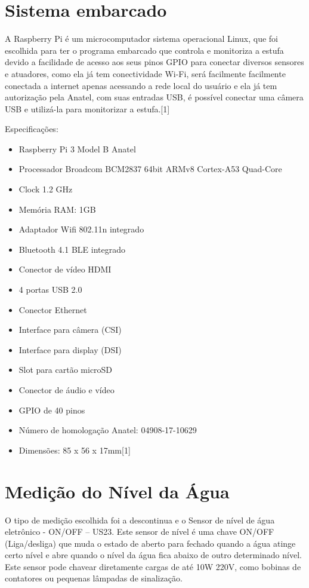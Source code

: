 \section{Sistema embarcado}
A Raspberry Pi é um microcomputador sistema operacional Linux, que foi escolhida para ter o programa embarcado que controla e monitoriza a estufa devido a facilidade de acesso aos seus pinos GPIO para conectar diversos sensores e atuadores, como ela já tem conectividade Wi-Fi, será facilmente facilmente conectada a internet apenas acessando a rede local do usuário e ela já tem autorização pela Anatel, com suas entradas USB, é possível conectar uma câmera USB e utilizá-la para monitorizar a estufa\cite{raspberry2018}.[1]

Especificações:

\begin{itemize}
	\item Raspberry Pi 3 Model B Anatel
	\item Processador Broadcom BCM2837 64bit ARMv8 Cortex-A53 Quad-Core
	\item Clock 1.2 GHz
	\item Memória RAM: 1GB
	\item Adaptador Wifi 802.11n integrado
	\item Bluetooth 4.1 BLE integrado
	\item Conector de vídeo HDMI
	\item 4 portas USB 2.0
	\item Conector Ethernet
	\item Interface para câmera (CSI)
	\item Interface para display (DSI)
	\item Slot para cartão microSD
	\item Conector de áudio e vídeo
	\item GPIO de 40 pinos
	\item Número de homologação Anatel: 04908-17-10629 
	\item Dimensões: 85 x 56 x 17mm[1]
\end{itemize}

\section{Medição do Nível da Água}

O tipo de medição escolhida foi a descontinua e o Sensor de nível de água eletrônico - ON/OFF – US23. Este sensor de nível é uma chave ON/OFF (Liga/desliga) que muda o estado de aberto para fechado quando a água atinge certo nível e abre quando o nível da água fica abaixo de outro determinado nível. Este sensor pode chavear diretamente cargas de até 10W 220V, como bobinas de contatores ou pequenas lâmpadas de sinalização.

